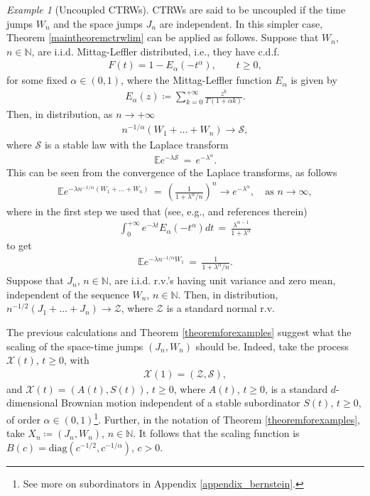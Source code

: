 \documentclass[reqno]{amsart}
\theoremstyle{remark}
\newtheorem{example}[theorem]{Example}
\numberwithin{equation}{section} %
\newcommand{\NN}{\mathbb{N}}
\newcommand{\1}{\mathds{1}}
\begin{document}
	
	\begin{example}[Uncoupled CTRWs]\label{example_uncoupled}
		CTRWs are said to be uncoupled if the time jumps $W_n$ and the space jumps $J_n$ are independent. In this simpler case, Theorem \ref{maintheoremctrwlim} can be applied as follows.
		Suppose that $W_n$, $n\in\NN$, are i.i.d. Mittag-Leffler distributed, i.e., they have c.d.f. 
		\begin{align}
			F(t) = 1-E_{\alpha}(-t^\alpha) , \qquad t\geq 0,
			\label{mlcdf}
		\end{align}
		for some fixed $\alpha \in (0,1)$, where the Mittag-Leffler function $E_\alpha$ is given by
		\begin{align}
			E_\alpha(z) \coloneqq \sum_{k=0}^{+\infty} \frac{z^k}{\Gamma (1+\alpha k)}.
		\end{align}
		Then, in distribution, as $n \to +\infty$
		\begin{align}
			n^{-1/\alpha}   (W_1 + \dots + W_n) \to \mathcal{S},
		\end{align}
		where $\mathcal{S}$ is a stable law with the Laplace transform
		\begin{align}
			\mathds{E}e^{- \lambda \mathcal{S}} \, = \, e^{-\lambda^\alpha}.
		\end{align}
		This can be seen from the convergence of the Laplace transforms, as follows
		\begin{align}
			\mathds{E}e^{-\lambda n^{-1/\alpha}   (W_1 + \dots + W_n) } \, = \, \left( \frac{1}{1+\lambda^\alpha/n} \right)^n  \to e^{-\lambda^\alpha}, \quad \text{as $n\to\infty$},
		\end{align}
		where in the first step we used that (see, e.g., \cite{scalas2006five} and references therein)
		\begin{align}
			\int_0^{+\infty} e^{-\lambda t} E_\alpha (-t^\alpha ) dt \, = \, \frac{\lambda^{\alpha-1}}{1+\lambda^\alpha}
		\end{align}
		to get
		\begin{align}
			\mathds{E}e^{-\lambda n^{-1/\alpha} W_1} \, = \, \frac{1 }{1+\lambda^\alpha /n}.
			\label{1649}
		\end{align}
		Suppose that $J_n$, $n\in \NN$, are i.i.d. r.v.'s having unit variance and zero mean, independent of the sequence $W_n$, $n\in\NN$. Then, in distribution, $n^{-1/2} (J_1 + \dots + J_n) \to \mathcal{Z}$, where $\mathcal{Z}$ is a standard normal r.v. 
		
		The previous calculations and Theorem \ref{theoremforexamples} suggest what the scaling of the space-time jumps $(J_n,W_n)$ should be. Indeed, take the process $\mathcal{X}(t)$, $t\ge0$, with
		\begin{align}
			\mathcal{X}(1) = (\mathcal{Z}, \mathcal{S}),
		\end{align}
		and $\mathcal{X}(t) = (A(t), S(t))$, $t \geq 0$, where $A(t)$, $t\ge0$, is a standard $d$-dimensional Brownian motion independent of a stable subordinator $S(t)$, $t\ge0$, of order $\alpha \in (0,1)$\footnote{See more on subordinators in {Appendix} \ref{appendix_bernstein}.}. Further, in the notation of Theorem \ref{theoremforexamples}, take $X_n \coloneqq  (J_n, W_n)$, $n\in\NN$. It follows that the scaling function is $B(c) = \text{diag}(c^{-1/2}, c^{-1/\alpha})$, $c>0$.
		

\end{example}
\end{document}
